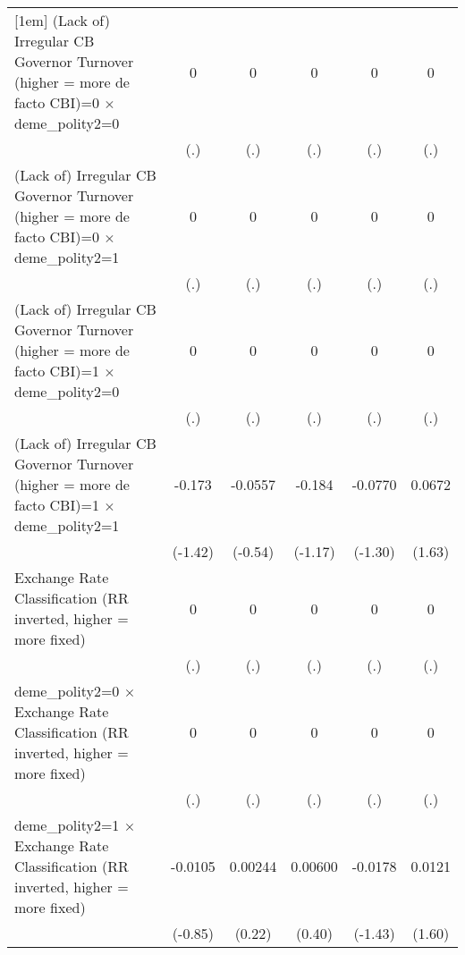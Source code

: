 {\begin{tabular}{l*{5}{c}}
[1em]
(Lack of) Irregular CB Governor Turnover (higher = more de facto CBI)=0 $\times$ deme\_polity2=0&        0         &        0         &        0         &        0         &        0         \\
                &      (.)         &      (.)         &      (.)         &      (.)         &      (.)         \\
[1em]
(Lack of) Irregular CB Governor Turnover (higher = more de facto CBI)=0 $\times$ deme\_polity2=1&        0         &        0         &        0         &        0         &        0         \\
                &      (.)         &      (.)         &      (.)         &      (.)         &      (.)         \\
[1em]
(Lack of) Irregular CB Governor Turnover (higher = more de facto CBI)=1 $\times$ deme\_polity2=0&        0         &        0         &        0         &        0         &        0         \\
                &      (.)         &      (.)         &      (.)         &      (.)         &      (.)         \\
[1em]
(Lack of) Irregular CB Governor Turnover (higher = more de facto CBI)=1 $\times$ deme\_polity2=1&   -0.173         &  -0.0557         &   -0.184         &  -0.0770         &   0.0672         \\
                &  (-1.42)         &  (-0.54)         &  (-1.17)         &  (-1.30)         &   (1.63)         \\
[1em]
Exchange Rate Classification (RR inverted, higher = more fixed)&        0         &        0         &        0         &        0         &        0         \\
                &      (.)         &      (.)         &      (.)         &      (.)         &      (.)         \\
[1em]
deme\_polity2=0 $\times$ Exchange Rate Classification (RR inverted, higher = more fixed)&        0         &        0         &        0         &        0         &        0         \\
                &      (.)         &      (.)         &      (.)         &      (.)         &      (.)         \\
[1em]
deme\_polity2=1 $\times$ Exchange Rate Classification (RR inverted, higher = more fixed)&  -0.0105         &  0.00244         &  0.00600         &  -0.0178         &   0.0121         \\
                &  (-0.85)         &   (0.22)         &   (0.40)         &  (-1.43)         &   (1.60)         \\

\end{tabular}}
